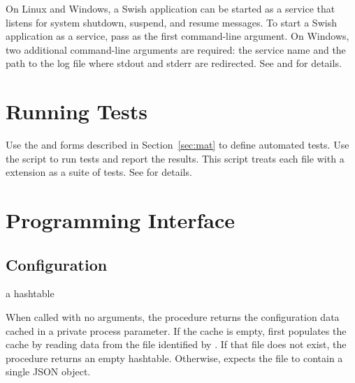 On Linux and Windows, a Swish application can be started as a service
that listens for system shutdown, suspend, and resume messages.
To start a Swish application as a service, pass  as
the first command-line argument.
On Windows, two additional command-line arguments are required:
the service name and the path to the log file where stdout and
stderr are redirected.
See \hyperref[swishservice]{} and
\hyperref[isservice]{} for details.



\section{Running Tests}

Use the  and  forms described in
Section~\ref{sec:mat} to define automated tests.
Use the  script to run tests and report the results.
This script treats each file with a  extension as a suite of tests.
See  for details.


\section {Programming Interface}

\subsection{Configuration}

\begin{procedure}
\end{procedure}
\returns{} a hashtable

When called with no arguments, the  procedure
returns the configuration data cached in a private process parameter.
If the cache is empty,  first populates the cache by reading
data from the file identified by .
If that file does not exist, the procedure returns an empty hashtable.
Otherwise,  expects the file to contain a single JSON object.

